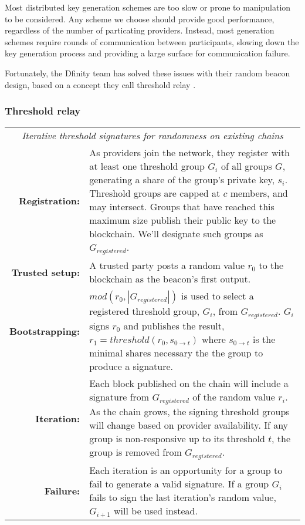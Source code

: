 \documentclass[11pt]{article}
\begin{document}
Most distributed key generation schemes are too slow or prone to
manipulation to be considered. Any scheme we choose should provide
good performance, regardless of the number of particating providers.
Instead, most generation schemes require rounds of communication
between participants, slowing down the key generation process and
providing a large surface for communication failure.

Fortunately, the Dfinity team has solved these issues with their
random beacon design, based on a concept they call threshold relay
\cite{thresholdRelay}.

\subsubsection{Threshold relay}

\begin{table*}[t]
  \centering
  \begin{tabular}{|rp{10cm}|}
  \hline
  \multicolumn{2}{|c|}{\textit{Iterative threshold signatures for
  randomness on existing chains}} \\
  \textbf{Registration:} & As providers join the network, they
  register with at least one threshold group $G_i$ of all groups $G$,
  generating a share of the group's private key, $s_i$. Threshold groups are
  capped at $c$ members, and may intersect. Groups that have reached
  this maximum size publish their public key to the blockchain. We'll
  designate such groups as $G_{registered}$. \\
  \textbf{Trusted setup:} & A trusted party posts a random value
  $r_0$ to the blockchain as the beacon's first output. \\
  \textbf{Bootstrapping:} & $mod(r_{0}, |G_{registered}|)$ is
  used to select a registered threshold group, $G_i$, from
  $G_{registered}$. $G_i$ signs $r_0$ and publishes the
  result, $r_1 = threshold(r_0, s_{0\rightarrow{t}})$ where
  $s_{0\rightarrow{t}}$ is the minimal shares necessary the the group
  to produce a signature. \\
  \textbf{Iteration:} & Each block published on the chain will include
  a signature from $G_{registered}$ of the random value $r_i$. As the
  chain grows, the signing threshold groups will change based on
  provider availability. If any group is non-responsive up to its
  threshold $t$, the group is removed from $G_{registered}$. \\
  \textbf{Failure:} & Each iteration is an opportunity for a
  group to fail to generate a valid signature. If a group $G_i$ fails
  to sign the last iteration's random value, $G_{i+1}$ will be used
  instead. \\
  \hline
\end{tabular}
\end{table*}
\end{document}
